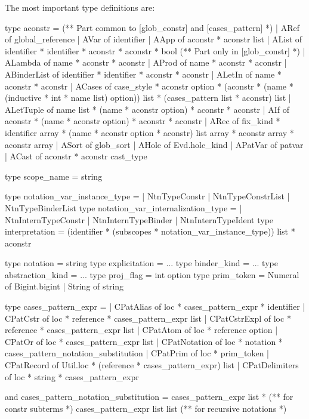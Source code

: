 \documentclass[a4paper,oneside]{book}
\begin{document}
The most important type definitions are:

\begin{code}
type aconstr =
  (** Part common to [glob_constr] and [cases_pattern] *)
  | ARef of global_reference
  | AVar of identifier
  | AApp of aconstr * aconstr list
  | AList of identifier * identifier * aconstr * aconstr * bool
  (** Part only in [glob_constr] *)
  | ALambda of name * aconstr * aconstr
  | AProd of name * aconstr * aconstr
  | ABinderList of identifier * identifier * aconstr * aconstr
  | ALetIn of name * aconstr * aconstr
  | ACases of case_style * aconstr option *
      (aconstr * (name * (inductive * int * name list) option)) list *
      (cases_pattern list * aconstr) list
  | ALetTuple of name list * (name * aconstr option) * aconstr * aconstr
  | AIf of aconstr * (name * aconstr option) * aconstr * aconstr
  | ARec of fix_kind * identifier array *
      (name * aconstr option * aconstr) list array * aconstr array *
      aconstr array
  | ASort of glob_sort
  | AHole of Evd.hole_kind
  | APatVar of patvar
  | ACast of aconstr * aconstr cast_type

type scope_name = string

type notation_var_instance_type =
  | NtnTypeConstr | NtnTypeConstrList | NtnTypeBinderList
type notation_var_internalization_type =
  | NtnInternTypeConstr | NtnInternTypeBinder | NtnInternTypeIdent
type interpretation =
    (identifier * (subscopes * notation_var_instance_type)) list * aconstr

type notation = string
type explicitation = ...
type binder_kind = ...
type abstraction_kind = ...
type proj_flag = int option
type prim_token = Numeral of Bigint.bigint | String of string

type cases_pattern_expr =
  | CPatAlias of loc * cases_pattern_expr * identifier
  | CPatCstr of loc * reference * cases_pattern_expr list
  | CPatCstrExpl of loc * reference * cases_pattern_expr list
  | CPatAtom of loc * reference option
  | CPatOr of loc * cases_pattern_expr list
  | CPatNotation of loc * notation * cases_pattern_notation_substitution
  | CPatPrim of loc * prim_token
  | CPatRecord of Util.loc * (reference * cases_pattern_expr) list
  | CPatDelimiters of loc * string * cases_pattern_expr

and cases_pattern_notation_substitution =
    cases_pattern_expr list *     (** for constr subterms *)
    cases_pattern_expr list list  (** for recursive notations *)


\end{code}
\end{document}
